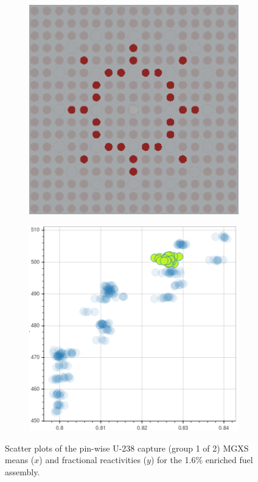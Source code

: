 \begin{figure}[h!]
\begin{subfigure}{0.45\textwidth}
  \caption{}
  \label{fig:chap10-capt-mean-pcm-mgxs-2}
\end{subfigure}
\begin{subfigure}{0.45\textwidth}
  \centering
  \includegraphics[width=0.9\linewidth]{figures/unsupervised/features/assm-16/u238-capt/mean-pcm/geometry-3}
  \caption{}
  \label{fig:chap10-capt-mean-pcm-geom-3}
\end{subfigure}%
\begin{subfigure}{0.45\textwidth}
  \centering
  \includegraphics[width=0.9\linewidth]{figures/unsupervised/features/assm-16/u238-capt/mean-pcm/mgxs-3}
  \caption{}
  \label{fig:chap10-capt-mean-pcm-mgxs-3}
\end{subfigure}
\caption[Clustering of U-238 capture MGXS fractional reactivities]{Scatter plots of the pin-wise U-238 capture (group 1 of 2) \ac{MGXS} means ($x$) and fractional reactivities ($y$) for the 1.6\% enriched fuel assembly.}
\label{fig:chap10-mean-pcm}
\end{figure}

